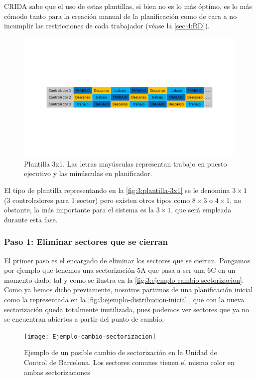 \gls{CRIDA} sabe que el uso de estas plantillas, si bien no es lo más óptimo, es lo más cómodo tanto para la creación manual de la planificación como de cara a no incumplir las restricciones de cada trabajador (véase la  \autoref{sec:4:RD}).

\begin{figure}
	\centering
	\includegraphics[width=0.9\linewidth]{capitulos/Capitulo3-Metodologia-propuesta/recursos/Plantilla-3x1}
	\caption[Plantilla 3x1]{Plantilla 3x1. Las letras mayúsculas representan trabajo en 
		puesto ejecutivo y las minúsculas en planificador.}
	\label{fig:3:plantilla-3x1}
\end{figure}

El tipo de plantilla representando en la \autoref{fig:3:plantilla-3x1} se le denomina $3\times1$ (3 controladores para 1 sector) pero existen otros tipos como $8\times3$ o $4\times1$, no obstante, la más importante para el sistema es la $3\times1$, que será empleada durante esta fase.

\subsubsection{Paso 1: Eliminar sectores que se cierran}
\label{sec:3:fase1-paso1}
El primer paso es el encargado de eliminar los sectores que se cierran. Pongamos por ejemplo que tenemos una 
sectorización 5A que pasa a ser una 6C en un momento dado, tal y como se ilustra en la 
\autoref{fig:3:ejemplo-cambio-sectorizacion}. Como ya hemos dicho previamente, nosotros partimos de una planificación inicial como la representada en la \autoref{fig:3:ejemplo-distribucion-inicial}, que con la nueva sectorización queda totalmente inutilizada, pues podemos ver sectores que ya no se encuentran abiertos a partir del punto de cambio.

\begin{figure}[htbp]
	\centering
	\texttt{[image: Ejemplo-cambio-sectorizacion]}
	\caption[Ejemplo de cambio de sectorización]{Ejemplo de un posible cambio de sectorización en la Unidad de Control 
	de Barcelona. Los sectores comunes tienen el mismo color en ambas sectorizaciones}
	\label{fig:3:ejemplo-cambio-sectorizacion}
\end{figure}


